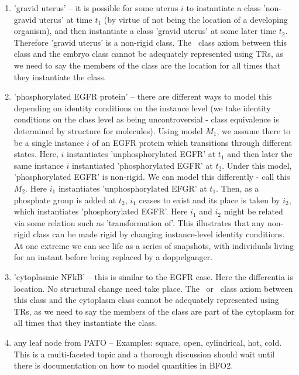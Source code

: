 \documentclass{bioinfo}
\begin{document}
\begin{enumerate}
  \item 'gravid uterus' -- it is possible for some uterus $i$ to
    instantiate a class 'non-gravid uterus' at time $t_1$ (by virtue
    of not being the location of a developing organism), and then
    instantiate a class 'gravid uterus' at some later time
    $t_2$. Therefore 'gravid uterus' is a non-rigid class. The
    \ class axiom between this class and the embryo
    class cannot be adequately represented using TRs, as we need to
    say the members of the class are the location for all times that
    they instantiate the class.


  \item 'phosphorylated EGFR protein' -- there are different ways to
    model this depending on identity conditions on the instance level
    (we take identity conditions on the class level as being
    uncontroversial - class equivalence is determined by structure for
    molecules). Using model $M_1$, we assume there to be a single
    instance $i$ of an EGFR protein which transitions through
    different states. Here, $i$ instantiates 'unphosphorylated EGFR'
    at $t_1$ and then later the same instance $i$ instantiated
    'phosphorylated EGFR' at $t_2$. Under this model, 'phosphorylated
    EGFR' is non-rigid. We can model this differently - call this
    $M_2$. Here $i_1$ instantiates 'unphosphorylated EFGR' at
    $t_1$. Then, as a phosphate group is added at $t_2$, $i_1$ ceases
    to exist and its place is taken by $i_2$, which instantiates
    'phosphorylated EGFR'. Here $i_1$ and $i_2$ might be related via
    some relation such as 'transformation of'. This illustrates that
    any non-rigid class can be made rigid by changing instance-level
    identity conditions. At one extreme we can see life as a series of
    snapshots, with individuals living for an instant before being
    replaced by a doppelganger.

  \item 'cytoplasmic NFkB' -- this is similar to the EGFR case. Here
    the differentia is location. No structural change need take
    place. The \ or \ class axiom between
    this class and the cytoplasm class cannot be adequately
    represented using TRs, as we need to say the members of the class
    are part of the cytoplasm for all times that they instantiate the
    class.

  \item any leaf node from PATO -- Examples: square, open,
    cylindrical, hot, cold. This is a multi-faceted topic and a
    thorough discussion should wait until there is documentation on
    how to model quantities in BFO2.

\end{enumerate}
\end{document}
